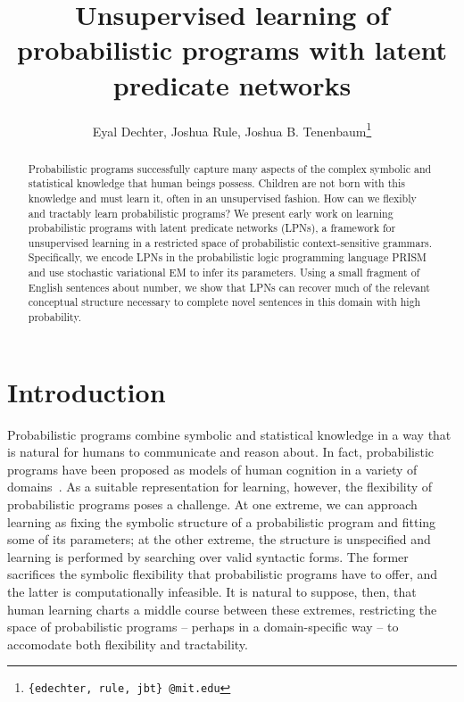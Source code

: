 \documentclass{article} %
\title{\vspace{-1.5cm} Unsupervised learning of probabilistic programs with latent predicate networks}
\author{Eyal Dechter,  Joshua Rule,  Joshua B. Tenenbaum\thanks{{\tt \{edechter, rule, jbt\} @mit.edu}}}
\affil{{\normalsize Department of Brain and Cognitive Sciences, MIT}}
\date{}
\begin{document}
\maketitle

\vspace{-1cm}
\begin{abstract}

  Probabilistic programs successfully capture many aspects of the
  complex symbolic and statistical knowledge that human beings
  possess. Children are not born with this knowledge and must learn
  it, often in an unsupervised fashion. How can we flexibly and
  tractably learn probabilistic programs? We present early work on
  learning probabilistic programs with latent predicate networks
  (LPNs), a framework for unsupervised learning in a restricted space
  of probabilistic context-sensitive grammars. Specifically, we encode
  LPNs in the probabilistic logic programming language PRISM and use
  stochastic variational EM to infer its parameters. Using a small
  fragment of English sentences about number, we show that LPNs can
  recover much of the relevant conceptual structure necessary to
  complete novel sentences in this domain with high probability.

\end{abstract}

\section{Introduction}


Probabilistic programs combine symbolic and statistical knowledge in a
way that is natural for humans to communicate and reason about. In
fact, probabilistic programs have been proposed as models of human
cognition in a variety of
domains~\cite{DBLP:journals/cogsr/StuhlmullerG14, lake2012concept}. As
a suitable representation for learning, however, the flexibility of
probabilistic programs poses a challenge. At one extreme, we can
approach learning as fixing the symbolic structure of a probabilistic
program and fitting some of its parameters; at the other extreme, the
structure is unspecified and learning is performed by searching over
valid syntactic forms. The former sacrifices the symbolic flexibility
that probabilistic programs have to offer, and the latter is
computationally infeasible. It is natural to suppose, then, that human
learning charts a middle course between these extremes, restricting
the space of probabilistic programs -- perhaps in a domain-specific
way -- to accomodate both flexibility and tractability.
\end{document}
